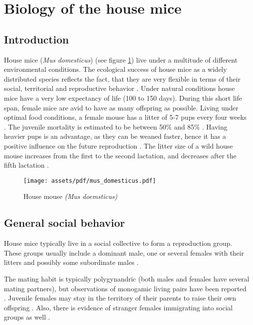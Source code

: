 \newpage
\section{Biology of the house mice}
\label{sec:biolhousemice}

\subsection{Introduction}
\label{subsec:introduction}

House mice (\textit{Mus domesticus}) (see figure \ref{fig:housemice}) live under a multitude of different environmental conditions. The ecological success of house mice as a widely distributed species reflects the fact, that they are very flexible in terms of their social, territorial and reproductive behavior \cite{bronson:79, bronson:84, berry:81}. Under natural conditions house mice have a very low expectancy of life (100 to 150 days). During this short life span, female mice are avid to have as many offspring as possible. Living under optimal food conditions, a female mouse has a litter of 5-7 pups every four weeks \cite{berry:71, pelikan:81}. The juvenile mortality is estimated to be between 50\% and 85\% \cite{berry:71, berry:75, pennycuik:86}. Having heavier pups is an advantage, as they can be weaned faster, hence it has a positive influence on the future reproduction \cite{fuchs:82}. The litter size of a wild house mouse increases from the first to the second lactation, and decreases after the fifth lactation \cite{pelikan:81, koenig:87b}. 

\begin{figure}[htbp]	
\centering	
\texttt{[image: assets/pdf/mus\_domesticus.pdf]}	
\caption[House mice]{House mouse \textit{(Mus doemsticus)}}
\label{fig:housemice}
\end{figure}

\subsection{General social behavior}
\label{subsec:socialbehaviour}
House mice typically live in a social collective to form a reproduction group. These groups usually include a dominant male, one or several females with their litters and possibly some subordinate males \cite{crowcroft:63, reimer:67, selander:70, mackintosh:81}.

The mating habit is typically polygynandric (both males and females have several mating partners), but observations of monogamic living pairs have been reported \cite{lidicker:76}. Juvenile females may stay in the territory of their parents to raise their own offspring \cite{petras:67}. Also, there is evidence of stranger females immigrating into social groups as well \cite{anderson:65, reimer:67, selander:70, bronson:79, baker:81}.     

